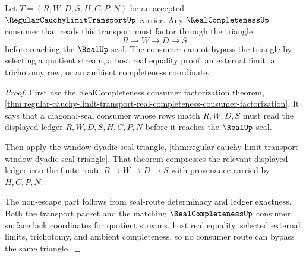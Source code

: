 \begin{theorem}
\label{thm:regular-cauchy-limit-transport-completion-boundary-nonescape}
Let $T=(R,W,D,S,H,C,P,N)$ be an accepted $\RegularCauchyLimitTransportUp$ carrier. Any $\RealCompletenessUp$ consumer that reads this transport must factor through the triangle
$$
R \to W \to D \to S
$$
before reaching the $\RealUp$ seal. The consumer cannot bypass the triangle by selecting a quotient stream, a host real equality proof, an external limit, a trichotomy row, or an ambient completeness coordinate.
\end{theorem}
\begin{proof}
First use the RealCompleteness consumer factorization theorem, \autoref{thm:regular-cauchy-limit-transport-real-completeness-consumer-factorization}. It says that a diagonal-seal consumer whose rows match $R,W,D,S$ must read the displayed ledger $R,W,D,S,H,C,P,N$ before it reaches the $\RealUp$ seal.

Then apply the window-dyadic-seal triangle, \autoref{thm:regular-cauchy-limit-transport-window-dyadic-seal-triangle}. That theorem compresses the relevant displayed ledger into the finite route $R \to W \to D \to S$ with provenance carried by $H,C,P,N$.

The non-escape part follows from seal-route determinacy and ledger exactness. Both the transport packet and the matching $\RealCompletenessUp$ consumer surface lack coordinates for quotient streams, host real equality, selected external limits, trichotomy, and ambient completeness, so no consumer route can bypass the same triangle.
\end{proof}


